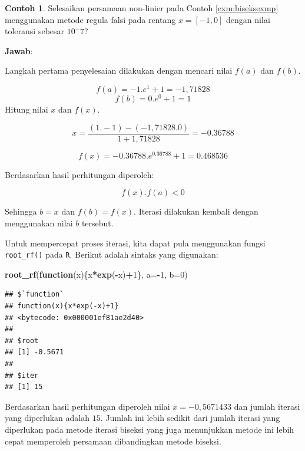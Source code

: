 \documentclass[
]{book}
\newenvironment{Shaded}{\begin{snugshade}}{\end{snugshade}}
\newcommand{\AttributeTok}[1]{\textcolor[rgb]{0.13,0.29,0.53}{#1}}
\newcommand{\ControlFlowTok}[1]{\textcolor[rgb]{0.13,0.29,0.53}{\textbf{#1}}}
\newcommand{\DecValTok}[1]{\textcolor[rgb]{0.00,0.00,0.81}{#1}}
\newcommand{\FunctionTok}[1]{\textcolor[rgb]{0.13,0.29,0.53}{\textbf{#1}}}
\newcommand{\NormalTok}[1]{#1}
\newcommand{\SpecialCharTok}[1]{\textcolor[rgb]{0.81,0.36,0.00}{\textbf{#1}}}
\theoremstyle{definition}
\theoremstyle{definition}
\newtheorem{example}{Contoh}[chapter]
\theoremstyle{definition}
\theoremstyle{definition}
\theoremstyle{remark}
\begin{document}
\begin{example}
\protect\hypertarget{exm:rfexmp}{}\label{exm:rfexmp}Selesaikan persamaan non-linier pada Contoh \ref{exm:biseksexmp} menggunakan metode regula falsi pada rentang \(x=\left[-1,0 \right]\) dengan nilai toleransi sebesar \(10^-7\)?
\end{example}

\textbf{Jawab}:

Langkah pertama penyelesaian dilakukan dengan mencari nilai \(f\left(a \right)\) dan \(f\left(b \right)\).

\[
f\left(a \right)=-1.e^{1}+1=-1,71828
\]
\[
f\left(b \right)=0.e^{0}+1=1
\]
Hitung nilai \(x\) dan \(f\left(x \right)\).

\[
x=\frac{\left(1.-1\right)-\left(-1,71828.0\right)}{1+1,71828}=-0.36788
\]

\[
f\left(x \right)=-0.36788.e^{0.36788}+1=0.468536
\]

Berdasarkan hasil perhitungan diperoleh:

\[
f\left(x \right).f\left(a \right)<0
\]

Sehingga \(b=x\) dan \(f\left(b \right)=f\left(x \right)\). Iterasi dilakukan kembali dengan menggunakan nilai \(b\) tersebut.

Untuk mempercepat proses iterasi, kita dapat pula menggunakan fungsi \texttt{root\_rf()} pada \texttt{R}. Berikut adalah sintaks yang digunakan:

\begin{Shaded}
\begin{Highlighting}[]
\FunctionTok{root\_rf}\NormalTok{(}\ControlFlowTok{function}\NormalTok{(x)\{x}\SpecialCharTok{*}\FunctionTok{exp}\NormalTok{(}\SpecialCharTok{{-}}\NormalTok{x)}\SpecialCharTok{+}\DecValTok{1}\NormalTok{\},}
               \AttributeTok{a=}\SpecialCharTok{{-}}\DecValTok{1}\NormalTok{, }\AttributeTok{b=}\DecValTok{0}\NormalTok{)}
\end{Highlighting}
\end{Shaded}

\begin{verbatim}
## $`function`
## function(x){x*exp(-x)+1}
## <bytecode: 0x000001ef81ae2d40>
## 
## $root
## [1] -0.5671
## 
## $iter
## [1] 15
\end{verbatim}

Berdasarkan hasil perhitungan diperoleh nilai \(x=-0,5671433\) dan jumlah iterasi yang diperlukan adalah \(15\). Jumlah ini lebih sedikit dari jumlah iterasi yang diperlukan pada metode iterasi biseksi yang juga menunjukkan metode ini lebih cepat memperoleh persamaan dibandingkan metode biseksi.
\end{document}
